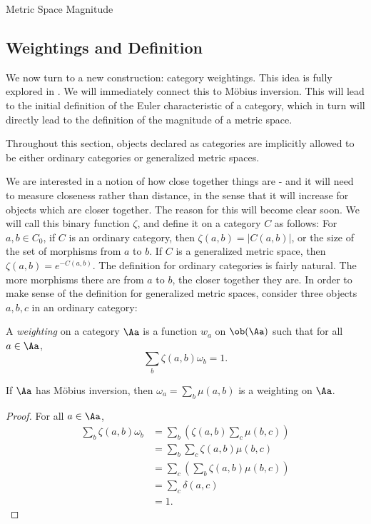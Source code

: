 \documentclass[12pt]{pom_thesis}
\begin{document}
\begin{chapter}{Metric Space Magnitude}
\subsection{Weightings and Definition}
We now turn to a new construction: category weightings. This idea is fully explored in \cite{Lein2}. We will immediately connect this to M\"obius inversion. This will lead to the initial definition of the Euler characteristic of a category, which in turn will directly lead to the definition of the magnitude of a metric space.

Throughout this section, objects declared as categories are implicitly allowed to be either ordinary categories or generalized metric spaces. 

We are interested in a notion of how close together things are - and it will need to measure closeness rather than distance, in the sense that it will increase for objects which are closer together. The reason for this will become clear soon. We will call this binary function $\zeta$, and define it on a category $C$ as follows: For $a,b \in C_0$, if $C$ is an ordinary category, then $\zeta(a,b) = |C(a,b)|$, or the size of the set of morphisms from $a$ to $b$. If $C$ is a generalized metric space, then $\zeta(a,b) = e^{-C(a,b)}$. The definition for ordinary categories is fairly natural. The more morphisms there are from $a$ to $b$, the closer together they are. In order to make sense of the definition for generalized metric spaces, consider three objects $a,b,c$ in an ordinary category:


\begin{defn}
A \emph{weighting} on a category $\Aa$ is a function $w_a$ on $\ob(\Aa)$ such that for all $a \in \Aa$,
\[
\sum_b \zeta(a,b)\omega_b = 1.
\]
\end{defn}
\begin{lemma}
\label{mobius_is_weighting}
If $\Aa$ has M\"obius inversion, then $\omega_a = \sum_b \mu(a,b)$ is a weighting on $\Aa$.
\end{lemma}
\begin{proof} For all $a \in \Aa$,
\begin{align*}
\sum_b \zeta(a,b)\omega_b &= \sum_b\left( \zeta(a,b)\sum_c \mu(b,c)\right)\\
&=\sum_b\sum_c\zeta(a,b)\mu(b,c)\\
&=\sum_c\left(\sum_b\zeta(a,b)\mu(b,c)\right)\\
&=\sum_c \delta(a,c)\\
&=1.
\end{align*}
\end{proof}


\end{chapter}
\end{document}
